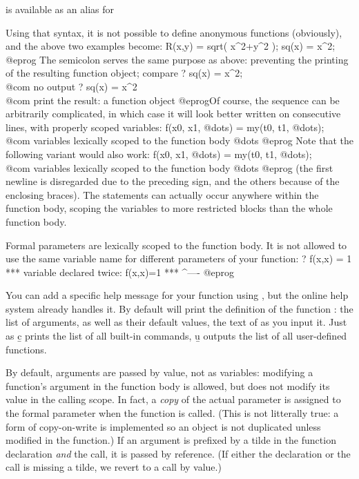 \noindent is available as an alias for


\noindent Using that syntax, it is not possible to define anonymous functions
(obviously), and the above two examples become:
\bprog
R(x,y) = sqrt( x^2+y^2 );
sq(x) = x^2;
@eprog\noindent
The semicolon serves the same purpose as above: preventing the printing
of the resulting function object; compare
\bprog
? sq(x) = x^2;  \\@com no output
? sq(x) = x^2   \\@com print the result: a function object
@eprog\noindent Of course, the sequence  can be arbitrarily
complicated, in which case it will look better written on consecutive lines,
with properly scoped variables:
\bprog
{
f(x0, x1, @dots) =
  my(t0, t1, @dots); \\@com variables lexically scoped to the function body
  @dots
}
@eprog \noindent Note that the following variant would also work:
\bprog
f(x0, x1, @dots) =
{
  my(t0, t1, @dots); \\@com variables lexically scoped to the function body
  @dots
}
@eprog \noindent
(the first newline is disregarded due to the preceding \kbd{=} sign, and the
others because of the enclosing braces). The  statements can actually
occur anywhere within the function body, scoping the variables to more
restricted blocks than the whole function body.

Formal parameters are lexically scoped to the function body. It is not
allowed to use the same variable name for different parameters of your
function:
\bprog
? f(x,x) = 1
  ***   variable declared twice: f(x,x)=1
  ***                                ^----
@eprog

You can add a specific help message for your function using ,
but the online help system already handles it. By default 
will print the definition of the function : the list of arguments,
as well as their default values, the text of  as you input it.
Just as \b{c} prints the list of all built-in commands, \b{u} outputs the
list of all user-defined functions.


By default, arguments are passed by value, not as variables: modifying a
function's argument in the function body is allowed, but does not modify its
value in the calling scope. In fact, a \emph{copy} of the actual parameter is
assigned to the formal parameter when the function is called. (This is not
litterally true: a form of copy-on-write is implemented so an object is not
duplicated unless modified in the function.) If an argument is prefixed by a
tilde \kbd{\til} in the function declaration \emph{and} the call, it is
passed by reference. (If either the declaration or the call is missing
a tilde, we revert to a call by value.)


